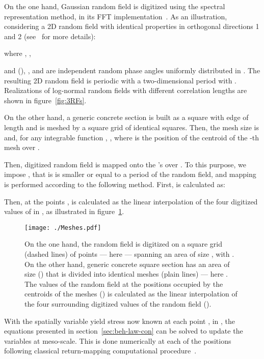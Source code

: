 \documentclass[12p]{amsart}
\begin{document}
On the one hand, Gaussian random field  is digitized using the spectral representation method, in its FFT implementation~\cite{ShiDeo1991, Deodatis1996, Shinozuka1996}. As an illustration, considering a 2D random field with identical properties in orthogonal directions 1 and 2 (see~\cite{Shinozuka1996} for more details):

where , ,

and  (), ,  and  are independent random phase angles uniformly distributed in . The resulting 2D random field is periodic with a two-dimensional period  with . Realizations of log-normal random fields with different correlation lengths are shown in figure~\ref{fig:3RFs}.

On the other hand, a generic concrete section  is built as a square with edge of length  and  is meshed by a square grid of  identical squares. Then, the mesh size is  and, for any integrable function , , where  is the position of the centroid of the -th mesh over .

Then, digitized random field  is mapped onto the 's over . To this purpose, we impose , that is  is smaller or equal to a period of the random field, and mapping is performed according to the following method. First,  is calculated as:

Then, at the  points ,  is calculated as the linear interpolation of the four digitized values of  in , as illustrated in figure~\ref{fig:meshes}.

\begin{figure}[htb]
\begin{center}
 \texttt{[image: ./Meshes.pdf]}
\caption{On the one hand, the random field is digitized on a square grid (dashed lines) of  points --- here  --- spanning an area of size , with . On the other hand, generic concrete square section  has an area of size  () that is divided into  identical meshes (plain lines) --- here . The values of the random field at the positions  occupied by the centroids of the  meshes () is calculated as the linear interpolation of the four surrounding digitized values of the random field ().}
\label{fig:meshes}
\end{center}
\end{figure}

With the spatially variable yield stress now known at each point ,  in , the equations presented in section~\ref{sec:beh-law-con} can be solved to update the variables at meso-scale. This is done numerically at each of the  positions following classical return-mapping computational procedure~\cite{SimHug1998, Ibrahimbegovic2009}.
\end{document}
